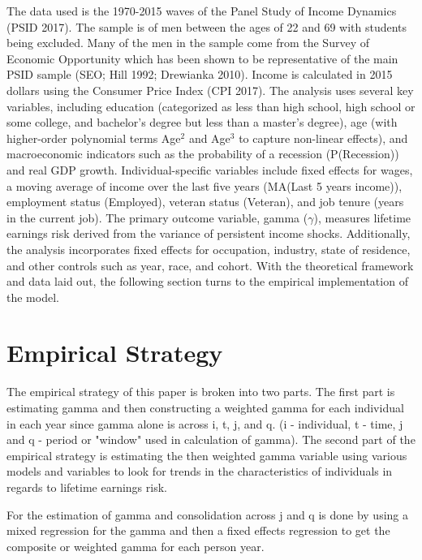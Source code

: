\documentclass[12pt]{article}
\begin{document}
\begin{onehalfspace}
The data used is the 1970-2015 waves of the Panel Study of Income Dynamics (PSID 2017). \cite{psid2017} The sample is of men between the ages of 22 and 69 with students being excluded. Many of the men in the sample come from the Survey of Economic Opportunity which has been shown to be representative of the main PSID sample (SEO; Hill 1992; Drewianka 2010). \cite{hill1992, drewianka2010} Income is calculated in 2015 dollars using the Consumer Price Index (CPI 2017). \cite{cpi2017} The analysis uses several key variables, including education (categorized as less than high school, high school or some college, and bachelor's degree but less than a master's degree), age (with higher-order polynomial terms Age$^2$ and Age$^3$ to capture non-linear effects), and macroeconomic indicators such as the probability of a recession (P(Recession)) and real GDP growth. Individual-specific variables include fixed effects for wages, a moving average of income over the last five years (MA(Last 5 years income)), employment status (Employed), veteran status (Veteran), and job tenure (years in the current job). The primary outcome variable, gamma ($\gamma$), measures lifetime earnings risk derived from the variance of persistent income shocks. Additionally, the analysis incorporates fixed effects for occupation, industry, state of residence, and other controls such as year, race, and cohort. With the theoretical framework and data laid out, the following section turns to the empirical implementation of the model.


\section{Empirical Strategy}

The empirical strategy of this paper is broken into two parts. The first part is estimating gamma and then constructing a weighted gamma for each individual in each year since gamma alone is across i, t, j, and q. (i - individual, t - time, j and q - period or "window" used in calculation of gamma). The second part of the empirical strategy is estimating the then weighted gamma variable using various models and variables to look for trends in the characteristics of individuals in regards to lifetime earnings risk.

For the estimation of gamma and consolidation across j and q is done by using a mixed regression for the gamma and then a fixed effects regression to get the composite or weighted gamma for each person year.


\end{onehalfspace}
\end{document}
